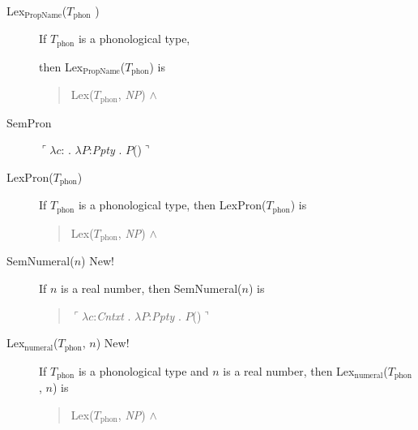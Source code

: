 \begin{description}
\item[\textnormal{Lex$_{\mathrm{PropName}}$($T_{\mathrm{phon}}$
    )}] \mbox{}

  If $T_{\mathrm{phon}}$ is a phonological type,

  then Lex$_{\mathrm{PropName}}$($T_{\mathrm{phon}}$) is
  \begin{quote}
    Lex($T_{\mathrm{phon}}$, \textit{NP}) \d{$\wedge$}
\end{quote}

\item[\textnormal{SemPron} ] \mbox{}

  $\ulcorner\lambda c$: . $\lambda
  P$:\textit{Ppty}
  . $P$()$\urcorner$

\item[\textnormal{LexPron($T_{\text{phon}}$)}] \mbox{}

If $T_{\text{phon}}$ is a phonological type, then
LexPron($T_{\text{phon}}$) is
\begin{quote}
Lex($T_{\mathrm{phon}}$, \textit{NP}) \d{$\wedge$}
\end{quote}

\item[\textnormal{SemNumeral($n$)} New!] \mbox{}

  If $n$ is a real number, then SemNumeral($n$) is
  \begin{quote}
    $\ulcorner\lambda c$:\textit{Cntxt} . $\lambda P$:\textit{Ppty}
    . $P$()$\urcorner$
  \end{quote}

  
\item[\textnormal{Lex$_{\mathrm{numeral}}$($T_{\mathrm{phon}}$, $n$)}
    New!] \mbox{}

    If $T_{\mathrm{phon}}$ is a phonological type and $n$ is a real
    number, then Lex$_{\mathrm{numeral}}$($T_{\mathrm{phon}}$, $n$) is
    \begin{quote}
      Lex($T_{\mathrm{phon}}$, \textit{NP}) \d{$\wedge$}
    \end{quote}
    


\end{description}
